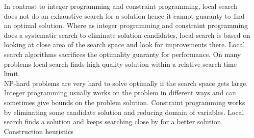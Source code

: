 In contrast to integer programming and constraint programming, local search does not do an exhaustive 
search for a solution hence it cannot guaranty to find an optimal solution. Where as integer programming and constraint 
programming does a systematic search to eliminate solution candidates, local search is based on looking at close area 
of the search space and look for improvements there. Local search algorithms sacrifices the optimality guaranty for 
performance. On many problems local search finds high quality solution within a relative search time limit. \\ 
NP-hard problems are very hard to solve optimally if the search space gets large. Integer programming usually works on 
the problem in different ways and can sometimes give bounds on the problem solution. Constraint programming works by 
eliminating some candidate solution and reducing domain of variables. Local search finds a solution and keeps searching 
close by for a better solution. \\ 
Construction heuristics